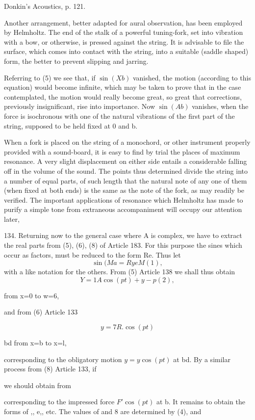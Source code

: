 Donkin's Acoustics, p. 121.

Another arrangement, better adapted for aural observation, has been employed by
Helmholtz. The end of the stalk of a powerful tuning-fork, set into vibration
with a bow, or otherwise, is pressed against the string. It is advisable to
file the surface, which comes into contact with the string, into a suitable
(saddle shaped) form, the better to prevent slipping and jarring.

Referring to (5) we see that, if \(\sin(Xb)\) vanished, the motion (according
to this equation) would become infinite, which may be taken to prove that in
the case contemplated, the motion would really become great, so great that
corrections, previously insignificant, rise into importance. Now \(\sin(Ab)\)
vanishes, when the force is isochronous with one of the natural vibrations of
the first part of the string, supposed to be held fixed at 0 and b.

When a fork is placed on the string of a monochord, or other instrument
properly provided with a sound-board, it is easy to find by trial the places of
maximum resonance. A very slight displacement on either side entails a
considerable falling off in the volume of the sound. The points thus determined
divide the string into a number of equal parts, of such length that the natural
note of any one of them (when fixed at both ends) is the same as the note of
the fork, as may readily be verified. The important applications of resonance
which Helmholtz has made to purify a simple tone from extraneous accompaniment
will occupy our attention later,

134. Returning now to the general case where A is complex, we have to extract
the real parts from (5), (6), (8) of Article 183. For this purpose the sines
which occur as factors, must be reduced to the form Re. Thus let
\[\sin(Ma = Ry eM (1),\]
with a like notation for the others. From (5) Article 138 we shall thus obtain
\[Y= 1A \cos(pt) + y-p (2),\]

from x=0 to w=6,

and from (6) Article 133

\[y=7 R. \cos(pt)\]

bd from x=b to x=l,

corresponding to the obligatory motion \(y =y \cos(pt)\) at bd. By a similar
process from (8) Article 133, if

we should obtain from

corresponding to the impressed force \(F' \cos(pt)\) at b. It remains to obtain
the forms of ,, e,, etc. The values of and 8 are determined by (4), and

